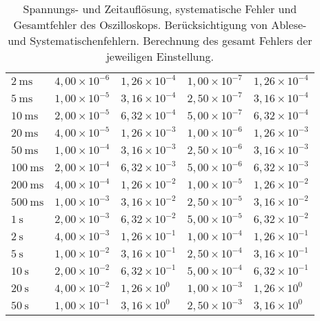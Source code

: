 \begin{table}[h!]
\begin{tabular}{l|l|l|l||l}
    \(2~\text{ms}\) & \(4,00\times 10^{-6}\) & \(1,26\times 10^{-4}\) & \(1,00\times 10^{-7}\) & \(1,26\times 10^{-4}\) \\
    \(5~\text{ms}\) & \(1,00\times 10^{-5}\) & \(3,16\times 10^{-4}\) & \(2,50\times 10^{-7}\) & \(3,16\times 10^{-4}\) \\
    \(10~\text{ms}\) & \(2,00\times 10^{-5}\) & \(6,32\times 10^{-4}\) & \(5,00\times 10^{-7}\) & \(6,32\times 10^{-4}\) \\
    \(20~\text{ms}\) & \(4,00\times 10^{-5}\) & \(1,26\times 10^{-3}\) & \(1,00\times 10^{-6}\) & \(1,26\times 10^{-3}\) \\
    \(50~\text{ms}\) & \(1,00\times 10^{-4}\) & \(3,16\times 10^{-3}\) & \(2,50\times 10^{-6}\) & \(3,16\times 10^{-3}\) \\
    \(100~\text{ms}\) & \(2,00\times 10^{-4}\) & \(6,32\times 10^{-3}\) & \(5,00\times 10^{-6}\) & \(6,32\times 10^{-3}\) \\
    \(200~\text{ms}\) & \(4,00\times 10^{-4}\) & \(1,26\times 10^{-2}\) & \(1,00\times 10^{-5}\) & \(1,26\times 10^{-2}\) \\
    \(500~\text{ms}\) & \(1,00\times 10^{-3}\) & \(3,16\times 10^{-2}\) & \(2,50\times 10^{-5}\) & \(3,16\times 10^{-2}\) \\
    \(1~\text{s}\) & \(2,00\times 10^{-3}\) & \(6,32\times 10^{-2}\) & \(5,00\times 10^{-5}\) & \(6,32\times 10^{-2}\) \\
    \(2~\text{s}\) & \(4,00\times 10^{-3}\) & \(1,26\times 10^{-1}\) & \(1,00\times 10^{-4}\) & \(1,26\times 10^{-1}\) \\
    \(5~\text{s}\) & \(1,00\times 10^{-2}\) & \(3,16\times 10^{-1}\) & \(2,50\times 10^{-4}\) & \(3,16\times 10^{-1}\) \\
    \(10~\text{s}\) & \(2,00\times 10^{-2}\) & \(6,32\times 10^{-1}\) & \(5,00\times 10^{-4}\) & \(6,32\times 10^{-1}\) \\
    \(20~\text{s}\) & \(4,00\times 10^{-2}\) & \(1,26\times 10^{0}\) & \(1,00\times 10^{-3}\) & \(1,26\times 10^{0}\) \\
    \(50~\text{s}\) & \(1,00\times 10^{-1}\) & \(3,16\times 10^{0}\) & \(2,50\times 10^{-3}\) & \(3,16\times 10^{0}\) \\
    \bottomrule
    \end{tabular}
    \caption{Spannungs- und Zeitauflösung, systematische Fehler und Gesamtfehler des Oszilloskops. Berücksichtigung von Ablese- und Systematischenfehlern. Berechnung des gesamt Fehlers der jeweiligen Einstellung.}
    \label{tab:all_fehler}
\end{table}
\twocolumn





